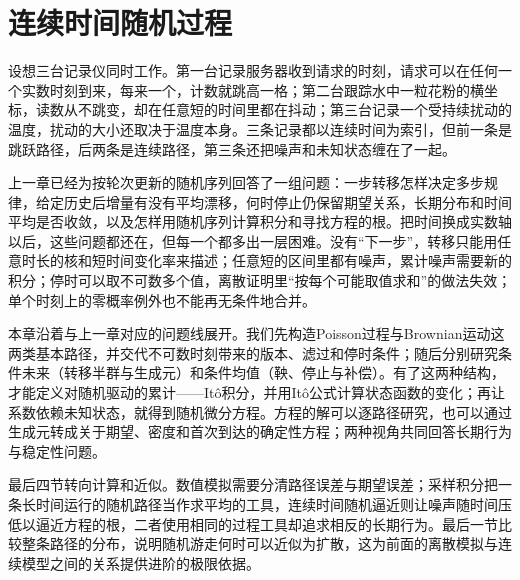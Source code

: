 \chapter{连续时间随机过程}
\label{chap:continuous-time-stochastic-processes}

设想三台记录仪同时工作。第一台记录服务器收到请求的时刻，请求可以在任何一个实数时刻到来，每来一个，计数就跳高一格；第二台跟踪水中一粒花粉的横坐标，读数从不跳变，却在任意短的时间里都在抖动；第三台记录一个受持续扰动的温度，扰动的大小还取决于温度本身。三条记录都以连续时间为索引，但前一条是跳跃路径，后两条是连续路径，第三条还把噪声和未知状态缠在了一起。

上一章已经为按轮次更新的随机序列回答了一组问题：一步转移怎样决定多步规律，给定历史后增量有没有平均漂移，何时停止仍保留期望关系，长期分布和时间平均是否收敛，以及怎样用随机序列计算积分和寻找方程的根。把时间换成实数轴以后，这些问题都还在，但每一个都多出一层困难。没有“下一步”，转移只能用任意时长的核和短时间变化率来描述；任意短的区间里都有噪声，累计噪声需要新的积分；停时可以取不可数多个值，离散证明里“按每个可能取值求和”的做法失效；单个时刻上的零概率例外也不能再无条件地合并。

本章沿着与上一章对应的问题线展开。我们先构造Poisson过程与Brownian运动这两类基本路径，并交代不可数时刻带来的版本、滤过和停时条件；随后分别研究条件未来（转移半群与生成元）和条件均值（鞅、停止与补偿）。有了这两种结构，才能定义对随机驱动的累计——Itô积分，并用Itô公式计算状态函数的变化；再让系数依赖未知状态，就得到随机微分方程。方程的解可以逐路径研究，也可以通过生成元转成关于期望、密度和首次到达的确定性方程；两种视角共同回答长期行为与稳定性问题。

最后四节转向计算和近似。数值模拟需要分清路径误差与期望误差；采样积分把一条长时间运行的随机路径当作求平均的工具，连续时间随机逼近则让噪声随时间压低以逼近方程的根，二者使用相同的过程工具却追求相反的长期行为。最后一节比较整条路径的分布，说明随机游走何时可以近似为扩散，这为前面的离散模拟与连续模型之间的关系提供进阶的极限依据。

